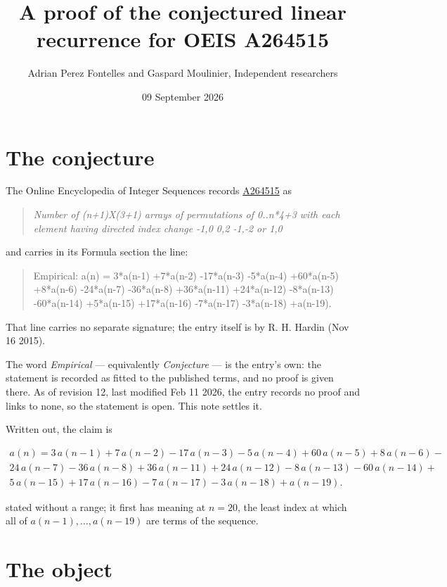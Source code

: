\documentclass[11pt]{article}
\title{A proof of the conjectured linear recurrence for OEIS A264515}
\author{Adrian Perez Fontelles and Gaspard Moulinier, Independent researchers}
\date{09 September 2026}
\theoremstyle{definition}
\begin{document}
\maketitle
\section{The conjecture}

The Online Encyclopedia of Integer Sequences records \href{https://oeis.org/A264515}{A264515} as

\begin{quote}\itshape Number of (n+1)X(3+1) arrays of permutations of 0..n*4+3 with each element having directed index change -1,0 0,2 -1,-2 or 1,0\end{quote}

and carries in its Formula section the line:

\begin{quote}\ttfamily Empirical: a(n) = 3*a(n-1) +7*a(n-2) -17*a(n-3) -5*a(n-4) +60*a(n-5) +8*a(n-6) -24*a(n-7) -36*a(n-8) +36*a(n-11) +24*a(n-12) -8*a(n-13) -60*a(n-14) +5*a(n-15) +17*a(n-16) -7*a(n-17) -3*a(n-18) +a(n-19).\end{quote}

That line carries no separate signature; the entry itself is by R. H. Hardin (Nov 16 2015).

The word {\itshape Empirical} --- equivalently {\itshape Conjecture} --- is the entry's own: the statement is recorded as fitted to the published terms, and no proof is given there. As of revision 12, last modified Feb 11 2026, the entry records no proof and links to none, so the statement is open. This note settles it.

Written out, the claim is

\begin{multline*} a(n) = 3\,a(n-1) + 7\,a(n-2) - 17\,a(n-3) - 5\,a(n-4) + 60\,a(n-5) + 8\,a(n-6) - \\ 24\,a(n-7) - 36\,a(n-8) + 36\,a(n-11) + 24\,a(n-12) - 8\,a(n-13) - 60\,a(n-14) + \\ 5\,a(n-15) + 17\,a(n-16) - 7\,a(n-17) - 3\,a(n-18) + a(n-19). \end{multline*}

stated without a range; it first has meaning at $n = 20$, the least index at which all of $a(n-1),\dots,a(n-19)$ are terms of the sequence.

\section{The object}
\end{document}
